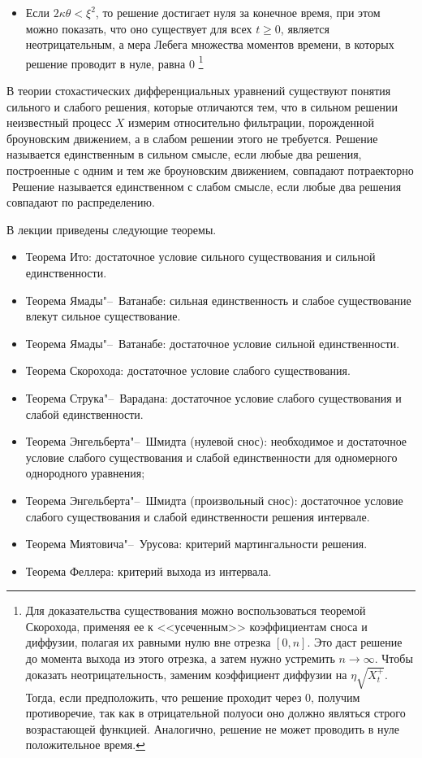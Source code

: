 \begin{itemize}
\item Если $2\kappa\theta<\xi^2$, то решение достигает нуля за конечное время, при этом можно показать, что оно существует для всех $t\ge 0$, является неотрицательным, а мера Лебега множества моментов времени, в которых решение проводит в нуле, равна 0 \as%
\footnote{Для доказательства существования можно воспользоваться теоремой Скорохода, применяя ее к <<усеченным>> коэффициентам сноса и диффузии, полагая их равными нулю вне отрезка $[0,n]$.
Это даст решение до момента выхода из этого отрезка, а затем нужно устремить $n\to\infty$.
Чтобы доказать неотрицательность, заменим коэффициент диффузии на $\eta\sqrt{X_t^+}$.
Тогда, если предположить, что решение проходит через 0, получим противоречие, так как в отрицательной полуоси оно должно являться строго возрастающей функцией.
Аналогично, решение не может проводить в нуле положительное время.}
\end{itemize}


\summary
В теории стохастических дифференциальных уравнений существуют понятия сильного и слабого решения, которые отличаются тем, что в сильном решении неизвестный процесс $X$ измерим относительно фильтрации, порожденной броуновским движением, а в слабом решении этого не требуется.
Решение называется единственным в сильном смысле, если любые два решения, построенные с одним и тем же броуновским движением, совпадают потраекторно \as\ 
Решение называется единственном с слабом смысле, если любые два решения совпадают по распределению.

В лекции приведены следующие теоремы.
\begin{itemize}
\item Теорема Ито: достаточное условие сильного существования и сильной единственности.
\item Теорема Ямады"--~Ватанабе: сильная единственность и слабое существование влекут сильное существование.
\item Теорема Ямады"--~Ватанабе: достаточное условие сильной единственности.
\item Теорема Скорохода: достаточное условие слабого существования.
\item Теорема Струка"--~Варадана: достаточное условие слабого существования и слабой единственности.
\item Теорема Энгельберта"--~Шмидта (нулевой снос): необходимое и достаточное условие слабого существования и слабой единственности для одномерного однородного уравнения;
\item Теорема Энгельберта"--~Шмидта (произвольный снос): достаточное условие слабого существования и слабой единственности решения интервале.
\item Теорема Миятовича"--~Урусова: критерий мартингальности решения.
\item Теорема Феллера: критерий выхода из интервала.
\end{itemize}

